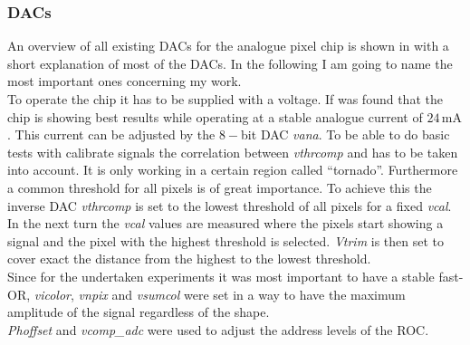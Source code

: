 \subsubsection{\ac{DAC}s}\label{sdacs}
An overview of all existing \ac{DAC}s for the analogue pixel chip is shown in  with a short explanation of most of the \ac{DAC}s. In the following I am going to name the most important ones concerning my work.\\
To operate the chip it has to be supplied with a voltage. If was found that the chip is showing best results while operating at a stable analogue current of $24\,$mA \cite{dambach}. This current can be adjusted by the $8-$bit \ac{DAC} \textit{vana}. To be able to do basic tests with calibrate signals the correlation between \textit{vthrcomp} and \textit{} has to be taken into account. It is only working in a certain region called ``tornado''. Furthermore a common threshold for all pixels is of great importance. To achieve this the inverse \ac{DAC} \textit{vthrcomp} is set to the lowest threshold of all pixels for a fixed \textit{vcal}. In the next turn the \textit{vcal} values are measured where the pixels start showing a signal and the pixel with the highest threshold is selected. \textit{Vtrim} is then set to cover exact the distance from the highest to the lowest threshold.\\
Since for the undertaken experiments it was most important to have a stable fast-OR, \textit{vicolor}, \textit{vnpix} and \textit{vsumcol} were set in a way to have the maximum amplitude of the signal regardless of the shape.\\
\textit{Phoffset} and \textit{vcomp\_adc} were used to adjust the address levels of the \ac{ROC}.
